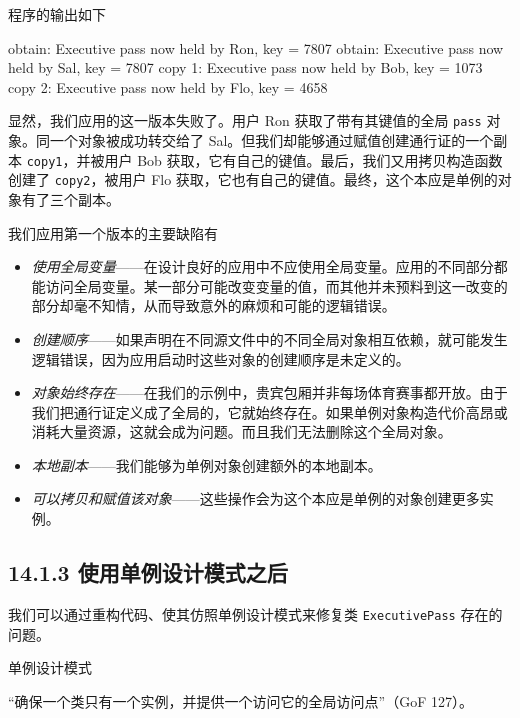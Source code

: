 程序的输出如下

\begin{codebox}
obtain: Executive pass now held by Ron, key = 7807
obtain: Executive pass now held by Sal, key = 7807
copy 1: Executive pass now held by Bob, key = 1073
copy 2: Executive pass now held by Flo, key = 4658
\end{codebox}

显然，我们应用的这一版本失败了。用户 Ron 获取了带有其键值的全局 \texttt{pass} 对象。同一个对象被成功转交给了 Sal。但我们却能够通过赋值创建通行证的一个副本 \texttt{copy1}，并被用户 Bob 获取，它有自己的键值。最后，我们又用拷贝构造函数创建了 \texttt{copy2}，被用户 Flo 获取，它也有自己的键值。最终，这个本应是单例的对象有了三个副本。


我们应用第一个版本的主要缺陷有

\begin{itemize}
\item \emph{使用全局变量}——在设计良好的应用中不应使用全局变量。应用的不同部分都能访问全局变量。某一部分可能改变变量的值，而其他并未预料到这一改变的部分却毫不知情，从而导致意外的麻烦和可能的逻辑错误。
\item \emph{创建顺序}——如果声明在不同源文件中的不同全局对象相互依赖，就可能发生逻辑错误，因为应用启动时这些对象的创建顺序是未定义的。
\item \emph{对象始终存在}——在我们的示例中，贵宾包厢并非每场体育赛事都开放。由于我们把通行证定义成了全局的，它就始终存在。如果单例对象构造代价高昂或消耗大量资源，这就会成为问题。而且我们无法删除这个全局对象。
\item \emph{本地副本}——我们能够为单例对象创建额外的本地副本。
\item \emph{可以拷贝和赋值该对象}——这些操作会为这个本应是单例的对象创建更多实例。
\end{itemize}

\subsection{14.1.3 使用单例设计模式之后}

我们可以通过重构代码、使其仿照单例设计模式来修复类 \texttt{Executive\allowbreak{}Pass} 存在的问题。

\begin{mySidebar}{单例设计模式}

“确保一个类只有一个实例，并提供一个访问它的全局访问点”（GoF 127）。
\end{mySidebar}

